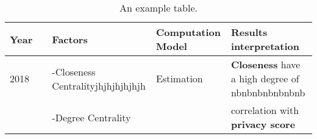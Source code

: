 	
\begin{table}[h!]
\scriptsize
\centering
	\begin{tabular}{lllll}
	Year &                            & \textbf{Factors}                  & \textbf{Computation Model} & \textbf{Results interpretation}                               \\\hline
	2018 & \cite{thubert_6tisch_2015} & -Closeness Centralityjhjhjhjhjhjh & Estimation                 & \textbf{Closeness} have a high degree of nbnbnbnbnbnbnb       \\
	\    &                            & -Degree Centrality                &                            & correlation with \textbf{privacy score}                       \\\hline
	\end{tabular}
	\caption{\label{tab:Table} An example table.}
\end{table}



